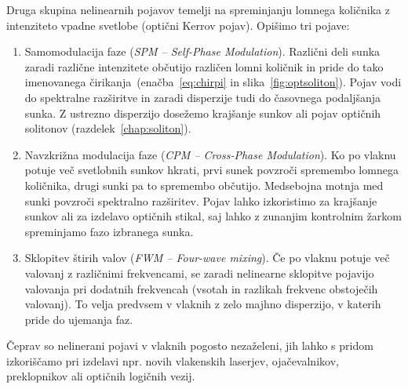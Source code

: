 Druga skupina nelinearnih pojavov temelji na spreminjanju 
lomnega količnika z intenziteto vpadne svetlobe (optični Kerrov pojav).
Opišimo tri pojave:
\begin{enumerate}
\item 
Samomodulacija faze ({\it SPM -- Self-Phase Modulation}). Različni deli
sunka zaradi različne intenzitete občutijo različen lomni količnik in pride
do tako imenovanega čirikanja~(enačba~\ref{eq:chirpi} 
in slika~\ref{fig:optsoliton}). 
Pojav vodi do spektralne razširitve in zaradi
disperzije tudi do časovnega podaljšanja sunka. Z ustrezno disperzijo dosežemo 
krajšanje sunkov ali pojav optičnih solitonov (razdelek~\ref{chap:soliton}).
\\

\item
Navzkrižna modulacija faze ({\it CPM -- Cross-Phase Modulation}). Ko po vlaknu
potuje več svetlobnih sunkov hkrati, prvi sunek povzroči spremembo lomnega količnika, 
drugi sunki pa to spremembo občutijo. Medsebojna motnja med sunki povzroči 
spektralno razširitev. Pojav lahko izkoristimo za krajšanje sunkov ali
za izdelavo optičnih stikal, 
saj lahko z zunanjim kontrolnim žarkom spreminjamo fazo izbranega sunka. \\

\item
Sklopitev štirih valov ({\it FWM -- Four-wave mixing}). Če po vlaknu potuje več
valovanj z različnimi frekvencami, 
se zaradi nelinearne sklopitve pojavijo
valovanja pri dodatnih frekvencah (vsotah in razlikah frekvenc obstoječih valovanj). To velja
predvsem v vlaknih z zelo majhno disperzijo, v katerih pride do ujemanja
faz.  
\end{enumerate}

Čeprav so nelinerani pojavi v vlaknih pogosto nezaželeni, jih lahko s pridom
izkoriščamo pri izdelavi npr. novih vlakenskih laserjev, ojačevalnikov, preklopnikov ali 
optičnih logičnih vezij. 
